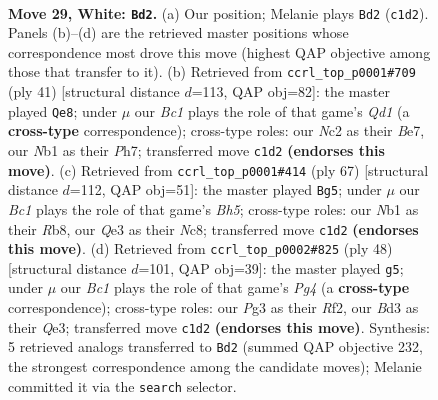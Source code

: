 \documentclass[11pt]{article}
\begin{document}
\clearpage

\begin{figure}[p]\centering
\begin{subfigure}{0.46\textwidth}\centering
\resizebox{\linewidth}{!}{%
\newchessgame
\chessboard[
  setfen={r2q1rk1/1bpn1pb1/3p1n2/1P1P3p/p6P/P2BQ1P1/1PN5/RNB2RK1 w - - 1 29},
  showmover=false,
  pgfstyle=straightmove, color=movearrow, markmove={c1-d2}
]}
\caption{}
\end{subfigure}\hfill
\begin{subfigure}{0.46\textwidth}\centering
\resizebox{\linewidth}{!}{%
\newchessgame
\chessboard[
  setfen={2rq1rk1/2p1b1pp/n2p2n1/Pp1Pp3/1P6/R4N1P/2N2PP1/2BQ1RK1 b - - 0 21},
  showmover=false,
  pgfstyle=straightmove, color=movearrow, markmove={d8-e8}
]}
\caption{}
\end{subfigure}
\\[4pt]
\begin{subfigure}{0.46\textwidth}\centering
\resizebox{\linewidth}{!}{%
\newchessgame
\chessboard[
  setfen={1rnqr2k/1p4p1/p2p2bp/P2P1p2/1BNP3b/5Q1P/1RPN2P1/5RK1 b - - 14 34},
  showmover=false,
  pgfstyle=straightmove, color=movearrow, markmove={h4-g5}
]}
\caption{}
\end{subfigure}\hfill
\begin{subfigure}{0.46\textwidth}\centering
\resizebox{\linewidth}{!}{%
\newchessgame
\chessboard[
  setfen={1rq2rnk/3n1pbp/3Pp3/p3P3/Npp2BP1/4QN1P/1P3R2/R5K1 w - - 1 25},
  showmover=false,
  pgfstyle=straightmove, color=movearrow, markmove={g4-g5}
]}
\caption{}
\end{subfigure}
\caption{\textbf{Move 29, White: \texttt{Bd2}.} (a) Our position; Melanie plays \texttt{Bd2} (\texttt{c1d2}). Panels (b)--(d) are the retrieved master positions whose correspondence most drove this move (highest QAP objective among those that transfer to it). (b) Retrieved from \texttt{ccrl\_top\_p0001\#709} (ply 41) [structural distance $d$=113, QAP obj=82]: the master played \texttt{Qe8}; under $\mu$ our \emph{Bc1} plays the role of that game's \emph{Qd1} (a \textbf{cross-type} correspondence); cross-type roles: our \emph{N}c2 as their \emph{B}e7, our \emph{N}b1 as their \emph{P}h7; transferred move \texttt{c1d2} \textbf{(endorses this move)}. (c) Retrieved from \texttt{ccrl\_top\_p0001\#414} (ply 67) [structural distance $d$=112, QAP obj=51]: the master played \texttt{Bg5}; under $\mu$ our \emph{Bc1} plays the role of that game's \emph{Bh5}; cross-type roles: our \emph{N}b1 as their \emph{R}b8, our \emph{Q}e3 as their \emph{N}c8; transferred move \texttt{c1d2} \textbf{(endorses this move)}. (d) Retrieved from \texttt{ccrl\_top\_p0002\#825} (ply 48) [structural distance $d$=101, QAP obj=39]: the master played \texttt{g5}; under $\mu$ our \emph{Bc1} plays the role of that game's \emph{Pg4} (a \textbf{cross-type} correspondence); cross-type roles: our \emph{P}g3 as their \emph{R}f2, our \emph{B}d3 as their \emph{Q}e3; transferred move \texttt{c1d2} \textbf{(endorses this move)}. Synthesis: 5 retrieved analogs transferred to \texttt{Bd2} (summed QAP objective 232, the strongest correspondence among the candidate moves); Melanie committed it via the \texttt{search} selector.}
\label{fig:thought-m56}
\end{figure}
\end{document}
